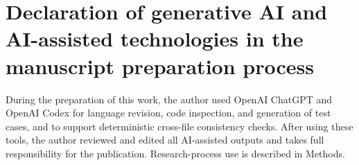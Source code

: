 \documentclass[preprint,12pt,numbers,sort&compress]{elsarticle}
\begin{document}
\section*{Declaration of generative AI and AI-assisted technologies in the manuscript preparation process}
During the preparation of this work, the author used OpenAI ChatGPT and OpenAI Codex for language revision, code inspection, and generation of test cases, and to support deterministic cross-file consistency checks. After using these tools, the author reviewed and edited all AI-assisted outputs and takes full responsibility for the publication. Research-process use is described in Methods.



\end{document}
